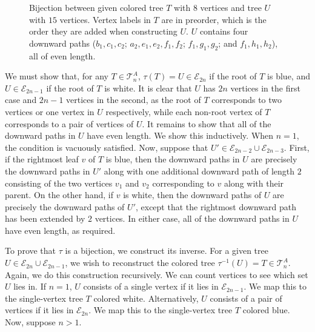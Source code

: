 \documentclass[12pt]{amsart}
\begin{document}
\begin{description}
\begin{figure}[htbp]
        \caption{Bijection between given colored tree $T$ with $8$ vertices 
        and tree $U$ with $15$ vertices. Vertex labels in $T$ are in preorder, which is the order they are added when constructing $U$. $U$ contains four downward paths ($b_1,c_1,c_2$; $a_2,e_1,e_2,f_1,f_2$; $f_1,g_1,g_2$; and $f_1,h_1,h_2$), all of even length.}\label{fig:root2bij}
    \end{figure}
    
    We must show that, for any $T\in\mathcal{T}_n^A$, $\tau(T) = U\in\mathcal{E}_{2n}$ if the root of $T$ is blue, and $U\in\mathcal{E}_{2n-1}$ if the root of $T$ is white. It is clear that $U$ has $2n$ vertices in the first case and $2n-1$ vertices in the second, as the root of $T$ corresponds to two vertices or one vertex in $U$ respectively, while each non-root vertex of $T$ corresponds to a pair of vertices of $U$. It remains to show that 
    all of the downward paths in $U$ have even length.
    We show this inductively. When $n=1$, the condition is vacuously satisfied. Now, suppose that $U'\in\mathcal{E}_{2n-2}\cup\mathcal{E}_{2n-3}$. First, if the rightmost leaf $v$ of $T$ is blue, then the downward paths in $U$ are precisely the downward paths in $U'$ along with one additional downward path of length $2$ consisting of the two vertices $v_1$ and $v_2$ corresponding to $v$ along with their parent. On the other hand, if $v$ is white, then the downward paths of $U$ are precisely the downward paths of $U'$, except that the rightmost downward path has been extended by $2$ vertices. In either case, all of the downward paths in $U$ have even length, as required.
    

    \item[Description of $\tau^{-1}$] To prove that $\tau$ is a bijection, we construct its inverse. For a given tree $U\in\mathcal{E}_{2n}\cup\mathcal{E}_{2n-1}$, we wish to reconstruct the colored tree $\tau^{-1}(U) = T\in\mathcal{T}_n^A$. Again, we do this construction recursively. We can count vertices to see which set $U$ lies in. If $n=1$, $U$ consists of a single vertex if it lies in $\mathcal{E}_{2n-1}$. We map this to the single-vertex tree $T$ colored white. Alternatively, $U$ consists of a pair of vertices if it lies in $\mathcal{E}_{2n}$. We map this to the single-vertex tree $T$ colored blue. Now, suppose $n>1$. 
    

\end{description}
\end{document}
